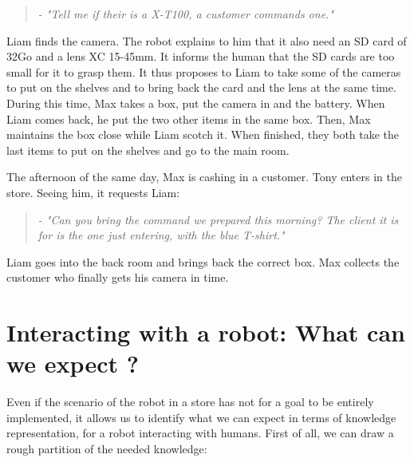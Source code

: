 \begin{quote} 
\centering 
\textit{
- "Tell me if their is a X-T100, a customer commands one."}
\end{quote}

Liam finds the camera. The robot explains to him that it also need an SD card of 32Go and a lens XC 15-45mm. It informs the human that the SD cards are too small for it to grasp them. It thus proposes to Liam to take some of the cameras to put on the shelves and to bring back the card and the lens at the same time. During this time, Max takes a box, put the camera in and the battery. When Liam comes back, he put the two other items in the same box. Then, Max maintains the box close while Liam scotch it. When finished, they both take the last items to put on the shelves and go to the main room.

The afternoon of the same day, Max is cashing in a customer. Tony enters in the store. Seeing him, it requests Liam:

\begin{quote} 
\centering 
\textit{
- "Can you bring the command we prepared this morning? The client it is for is the one just entering, with the blue T-shirt."}
\end{quote}

Liam goes into the back room and brings back the correct box. Max collects the customer who finally gets his camera in time.

\section{Interacting with a robot: What can we expect ?}

Even if the scenario of the robot in a store has not for a goal to be entirely implemented, it allows us to identify what we can expect in terms of knowledge representation, for a robot interacting with humans. First of all, we can draw a rough partition of the needed knowledge:

